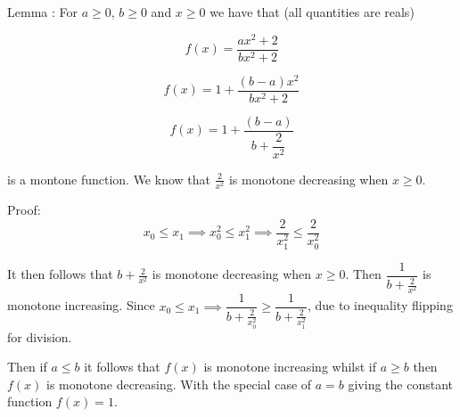 \documentclass[10pt]{article}
\begin{document}
Lemma : For $a \ge 0$, $b \ge 0$ and $x \ge 0 $ we have that (all quantities are reals)

\begin{equation}
f(x) = \dfrac{a x^2 + 2}{ b x^2 + 2}
\end{equation}

\begin{equation}
f(x) = 1 + \dfrac{\left(b - a \right) x^2}{ b x^2 + 2}
\end{equation}

\begin{equation}
f(x) = 1 + \dfrac{\left(b - a \right)}{ b +  \dfrac{2}{x^2}}
\end{equation}

is a montone function. We know that $\frac{2}{x^2}$ is monotone decreasing when $x \ge 0$.

Proof:
\[x_0 \le x_1 \implies x_0^2 \le x_1^2 \implies \dfrac{2}{x_1^2} \le \dfrac{2}{x_0^2}   \]

It then follows that $b +  \frac{2}{x^2}$ is monotone decreasing when $x \ge 0$. Then $\dfrac{1}{b +  \frac{2}{x^2}}$ is monotone increasing. Since $x_0 \le x_1 \implies  \dfrac{1}{b +  \frac{2}{x_0^2}} \ge \dfrac{1}{b +  \frac{2}{x_1^2}}$, due to inequality flipping for division. 

Then if $a \le b$ it follows that $f(x)$ is monotone increasing whilst if $a \ge b$ then $f(x)$ is monotone decreasing. With the special case of $a = b$ giving the constant function $f(x) = 1$.
\end{document}
